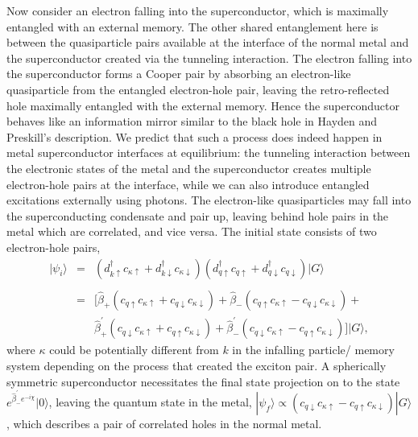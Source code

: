 \documentclass[12pt,letterpaper,aps,onecolumn,superscriptaddress,floatfix,notitlepage]{revtex4-1}
\begin{document}
	Now consider an electron falling into the superconductor, which is maximally entangled with an external memory. The other shared entanglement here is between the quasiparticle pairs available at the interface of the normal metal and the superconductor created via the tunneling interaction. The electron falling into the superconductor forms a Cooper pair by absorbing an electron-like quasiparticle from the entangled electron-hole pair, leaving the retro-reflected hole maximally entangled with the external memory. Hence the superconductor behaves like an information mirror similar to the black hole in Hayden and Preskill's description. We predict that such a process does indeed happen in metal superconductor interfaces at equilibrium: the tunneling interaction between the electronic states of the metal and the superconductor creates multiple electron-hole pairs at the interface, while we can also introduce entangled excitations externally using photons. The electron-like quasiparticles may fall into the superconducting condensate and pair up, leaving behind hole pairs in the metal which are correlated, and vice versa. 
	The initial state consists of two electron-hole pairs,  
	\begin{eqnarray}|\psi_{i}\rangle &=& (d_{k\uparrow}^{\dagger}c_{\kappa\uparrow}+d_{k\downarrow}^{\dagger}c_{\kappa\downarrow})(d_{q\uparrow}^{\dagger}c_{q\uparrow}+d_{q\downarrow}^{\dagger}c_{q\downarrow})|G\rangle\\\nonumber\\
	&=&[\hat{\beta}_{+}(c_{q\uparrow}c_{\kappa\uparrow}+c_{q\downarrow}c_{\kappa\downarrow})+\hat{\beta}_{-}(c_{q\uparrow}c_{\kappa\uparrow}-c_{q\downarrow}c_{\kappa\downarrow})+\nonumber\\
	&&\hat{\beta}^{'}_{+}(c_{q\downarrow}c_{\kappa\uparrow}+c_{q\uparrow}c_{\kappa\downarrow})+
	\hat{\beta}^{'}_{-}(c_{q\downarrow}c_{\kappa\uparrow}-c_{q\uparrow}c_{\kappa\downarrow})]|G\rangle,\end{eqnarray}
	where $\kappa$ could be potentially different from $k$ in the infalling particle/ memory system depending on the process that created the exciton pair. 	A spherically symmetric superconductor necessitates the final state projection on to the state $e^{\hat{\beta}^{'}_{-}e^{-i\chi}}|0\rangle$, leaving the quantum state in the metal, $
	|\psi_{f}\rangle\propto(c_{q\downarrow}c_{\kappa\uparrow}-c_{q\uparrow}c_{\kappa\downarrow})|G\rangle$, which describes a pair of correlated holes in the normal metal.	
\end{document}
